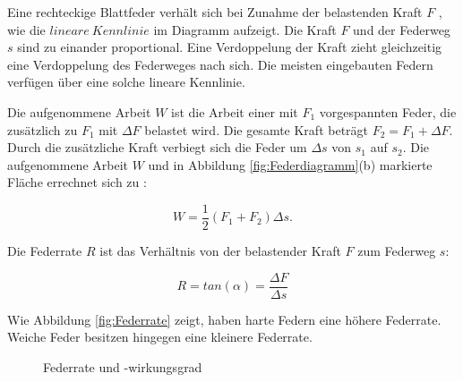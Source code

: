 Eine rechteckige Blattfeder verhält sich bei Zunahme der belastenden Kraft $F$ , wie die $lineare~Kennlinie$ im Diagramm aufzeigt. Die Kraft $F$ und der Federweg $s$ sind zu einander proportional. Eine Verdoppelung der Kraft zieht gleichzeitig eine Verdoppelung des Federweges nach sich. Die meisten eingebauten Federn verfügen über eine solche lineare Kennlinie. 

Die aufgenommene Arbeit $W$ ist die Arbeit einer mit $F_1$ vorgespannten Feder, die zusätzlich zu $F_1$ mit $\Delta F$ belastet wird. Die gesamte Kraft beträgt $F_2 = F_1 + \Delta F$. Durch die zusätzliche Kraft verbiegt sich die Feder um $\Delta s$ von $s_1$ auf $s_2$. Die aufgenommene Arbeit $W$ und in Abbildung \ref{fig:Federdiagramm}(b) markierte Fläche errechnet sich zu :

\begin{equation}
W = \frac{1}{2} (F_1 + F_2) \Delta s.
\label{Federarbeit}
\end{equation}


Die Federrate $R$ ist das Verhältnis von der belastender Kraft $F$ zum Federweg $s$:

\begin{equation}
R = tan (\alpha)= \frac{\Delta F}{\Delta s}
\label{eq:Federrate}
\end{equation}


Wie Abbildung \ref{fig:Federrate} zeigt, haben harte Federn eine höhere Federrate. Weiche Feder besitzen hingegen eine kleinere Federrate. 


\begin{figure}[htb]
\centering
{}
\caption{Federrate und -wirkungsgrad}
\label{fig:Federrate und -wirkungsgrad}
\end{figure}


